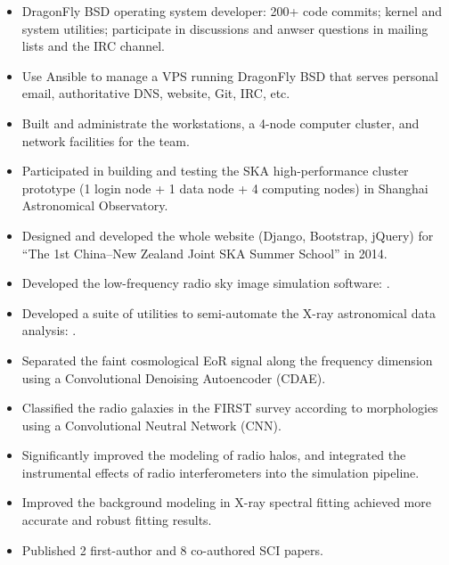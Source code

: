 \documentclass{resume}
\begin{document}
\begin{itemize}
  \item DragonFly BSD operating system developer:
    200+ code commits; kernel and system utilities;
    participate in discussions and anwser questions
    in mailing lists and the IRC channel.
  \item Use Ansible to manage a VPS running DragonFly BSD that serves
    personal email, authoritative DNS, website, Git, IRC, etc.
  \item Built and administrate the workstations, a 4-node computer cluster,
    and network facilities for the team.
  \item Participated in building and testing the SKA high-performance
    cluster prototype (1 login node + 1 data node + 4 computing nodes)
    in Shanghai Astronomical Observatory.
  \item Designed and developed the whole website (Django, Bootstrap, jQuery)
    for \enquote{The 1st China--New Zealand Joint SKA Summer School}
    in 2014.
\end{itemize}

\begin{itemize}
  \item Developed the low-frequency radio sky image simulation software:
    .
  \item Developed a suite of utilities to semi-automate the
    X-ray astronomical data analysis:
    .
  \item Separated the faint cosmological EoR signal along the frequency
    dimension using a Convolutional Denoising Autoencoder (CDAE).
  \item Classified the radio galaxies in the FIRST survey according to
    morphologies using a Convolutional Neutral Network (CNN).
  \item Significantly improved the modeling of radio halos,
    and integrated the instrumental effects of radio interferometers
    into the simulation pipeline.
  \item Improved the background modeling in X-ray spectral fitting
    achieved more accurate and robust fitting results.
  \item Published 2 first-author and 8 co-authored SCI papers.
\end{itemize}
\end{document}
